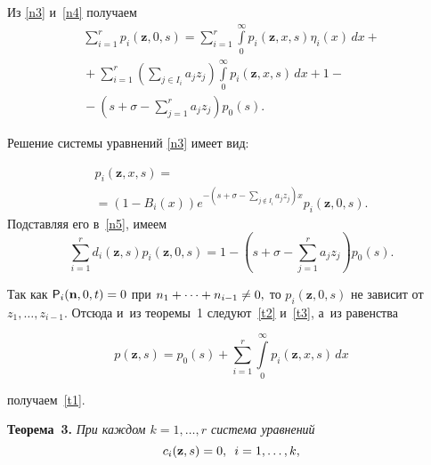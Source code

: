 \begin{multicols}{2}
\vspace*{-2pt}

\noindent
Из \eqref{n3} и~\eqref{n4} получаем
\begin{multline}
\label{n5}
\sum\limits_{i=1}^rp_i(\mathbf{z},0,s)=\sum\limits_{i=1}^r\int\limits_0^{\infty}p_i(\mathbf{z},x,s)\eta_i(x)\,dx+{}\\
{}+\sum\limits_{i=1}^r\left(\sum\limits_{j\in I_i}a_jz_j\right)\int\limits_0^{\infty}p_i(\mathbf{z},x,s)\,dx+
1-{}\\
{}-\left(s+\sigma-\sum\limits_{j=1}^r a_j z_j \right)p_0(s).
\end{multline}

\vspace*{-2pt}

\noindent
Решение системы уравнений \eqref{n3} имеет вид:

\vspace*{-2pt}

\noindent
\begin{multline*}
p_i(\mathbf{z},x,s)={}\\
{}=(1-B_i(x))e^{-\left(s+\sigma-\sum\nolimits_{j\notin I_i}a_jz_j\right)x}p_i(\mathbf{z},0,s).
\end{multline*}
Подставляя его в~\eqref{n5}, имеем
\begin{equation*}
\sum\limits_{i=1}^r d_i(\mathbf{z},s)p_i(\mathbf{z},0,s)=1-\left(s+\sigma-\sum\limits_{j=1}^r a_j z_j\right)p_0(s).
\end{equation*}


\noindent
Так как ${\sf P}_i(\mathbf{n},0,t)\hm=0$ при $n_1+\cdots+n_{i-1}\hm\neq 0,$ то $p_i(\mathbf{z},0,s)$ не зависит от $z_1,\ldots,z_{i-1}.$
Отсюда и~из теоремы~1 следуют~\eqref{t2} и~\eqref{t3}, а~из равенства 


\noindent
$$
p(\mathbf{z},s)=p_0(s)+\sum\limits_{i=1}^r \int\limits_0^{\infty}p_i(\mathbf{z},x,s)\,dx
$$ 

\vspace*{-3pt}

\noindent
получаем~\eqref{t1}.

\smallskip

\noindent
\textbf{Теорема~3.} \textit{При каждом $k=1,\ldots,r$ система урав\-нений}
$$
c_i(\mathbf{z},s)=0,\enskip i=1,\ldots,k,
$$

\vspace*{-3pt}


\end{multicols}
